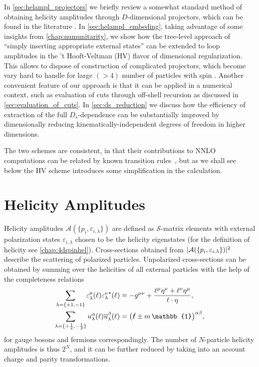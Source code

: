 In \cref{sec:helampl_projectors} we briefly review a somewhat standard 
method of obtaining helicity amplitudes through $D$-dimensional projectors,
which can be found in the literature \cite{Garland:2002ak, Moch:2002hm, Glover:2003cm, Glover:2004si,Gehrmann:2009vu,Gehrmann:2011aa}. 
In \cref{sec:helampl_embeding}, 
taking advantage of some insights from \cref{chap:numunitarity},
we show how the tree-level approach of ``simply inserting appropriate external states'' can
be extended to loop amplitudes in the 't Hooft-Veltman (HV) flavor of dimensional regularization.
This allows to dispose of construction of complicated projectors, which
become vary hard to handle for large $(> 4)$ number of particles with spin \cite{Peraro:2019cjj}. 
Another convenient feature of our approach is that it can be applied in a numerical context, such
as evaluation of cuts through off-shell recursion as discussed in \cref{sec:evaluation_of_cuts}.
In \cref{sec:ds_reduction} we discuss how
the efficiency of extraction of the full $D_s$-dependence can be substantially improved
by dimensionally reducing kinematically-independent degrees of freedom in higher dimensions.


The two schemes are consistent,
in that their contributions to NNLO computations can be related by known
transition rules~\cite{Broggio:2015dga}, but as we
shall see below the HV scheme introduces some simplification in
the calculation.


\section{Helicity Amplitudes}

Helicity amplitudes $\mathcal{A}(\{p_i,\varepsilon_{i,\lambda}\})$ 
are defined as $\mathcal{S}$-matrix elements
with external polarization states $\varepsilon_{i,\lambda}$ chosen to be
the helicity eigenstates (for the definition of helicity see \cref{chap:4dspinhel}).
Cross-sections obtained from $\vert \mathcal{A}(\{p_i,\varepsilon_{i,\lambda}\}) \vert^2$ describe
the scattering of polarized particles.
Unpolarized cross-sections can be obtained by summing over the helicities of all external particles
with the help of the completeness relations
\begin{subequations}
  \begin{align}
    \sum_{\lambda=\{+1,-1\}} \varepsilon^\mu_\lambda(\ell){\varepsilon^\nu_\lambda}^{\star{}}(\ell)  &= -g^{\mu\nu} + \frac{\ell^\mu \eta^\nu + \ell^\nu \eta^\mu}{\sp(\ell,\eta)}, \\
    \sum_{\lambda=\{+\frac{1}{2},-\frac{1}{2}\}} u^\alpha_\lambda(\ell){\overline{u}_\lambda^\beta}(\ell)  &= \qty(\slashed{\ell}  \pm m\,\mathbb{1})^{\alpha\beta},
  \end{align}
\end{subequations}
for gauge bosons and fermions correspondingly.
The number of $N$-particle helicity amplitudes is thus $2^N$, and
it can be further reduced by taking into an account charge and parity transformations.

